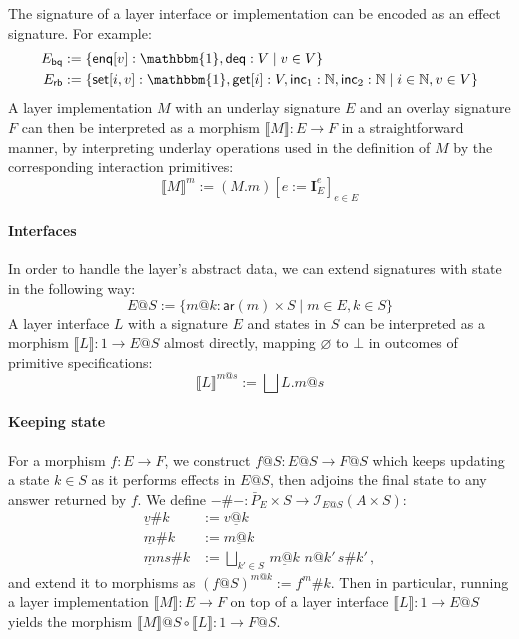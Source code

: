 \documentclass[sigplan,screen]{acmart}
\newcommand{\kw}[1]{\ensuremath{ \mathsf{#1} }}
\begin{document}
The signature of a layer interface or implementation
can be encoded as an effect signature.
For example:
\begin{align*}
  E_\kw{bq} &:= \{
    \kw{enq}[v] : \mathbbm{1}, \kw{deq} : V \mid
    v \in V \} \\
  E_\kw{rb} &:= \{
    \kw{set}[i, v] : \mathbbm{1},
    \kw{get}[i] : V,
    \kw{inc}_1 : \mathbb{N},
    \kw{inc}_2 : \mathbb{N} \mid
    i \in \mathbb{N}, v \in V \}
\end{align*}
A layer implementation $M$ with
an underlay signature $E$ and
an overlay signature $F$
can then be interpreted as a morphism
$\llbracket M \rrbracket : E \rightarrow F$
in a straightforward manner,
by interpreting underlay operations
used in the definition of $M$
by the corresponding interaction primitives:
\[
  \llbracket M \rrbracket^m := (M.m)[e := \mathbf{I}_E^e]_{e \in E}
\]

\paragraph{Interfaces}
In order to handle the layer's abstract data,
we can extend signatures with state in the following way:
\[
  E@S :=
    \{ m@k : \kw{ar}(m) \times S \mid
       m \in E, k \in S \}
\]
A layer interface $L$ with a signature $E$
and states in $S$
can be interpreted as
a morphism $\llbracket L \rrbracket : 1 \rightarrow E@S$
almost directly,
mapping $\varnothing$ to $\bot$
in outcomes of primitive specifications:
\[
  \llbracket L \rrbracket^{m@s} :=
    \bigsqcup L.m@s
\]

\paragraph{Keeping state}
For a morphism $f : E \rightarrow F$,
we construct $f@S : E@S \rightarrow F@S$
which keeps updating a state $k \in S$
as it performs effects in $E@S$,
then adjoins the final state to any answer
returned by $f$.
We define
$-\#- : \bar{P}_E \times S \rightarrow \mathcal{I}_{E@S}(A \times S)$:
\begin{align*}
  \underline{v}\#k &:= \underline{v@k} \\
  \underline{m}\#k &:= \underline{m@k} \\
  \underline{m}ns\#k &:=
    \bigsqcup_{k' \in S} \, \underline{m@k} \,\, n@k' \, s\#k' \,,
\end{align*}
and extend it to morphisms as $(f@S)^{m@k} := f^m\#k$.
Then in particular,
running a layer implementation
$\llbracket M \rrbracket : E \rightarrow F$
on top of a layer interface
$\llbracket L \rrbracket : 1 \rightarrow E@S$
yields the morphism
$\llbracket M \rrbracket @ S \circ \llbracket L \rrbracket :
 1 \rightarrow F@S$.
\end{document}
